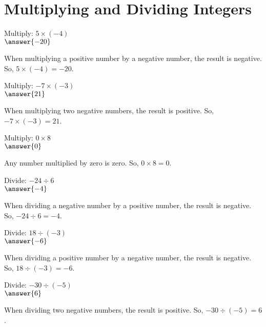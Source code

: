 \documentclass{ximera}
\begin{document}


\section*{Multiplying and Dividing Integers}

\begin{problem}
Multiply: $5 \times (-4)$\\
$\answer{-20}$
\begin{feedback}
When multiplying a positive number by a negative number, the result is negative. So, $5 \times (-4) = -20$.
\end{feedback}
\end{problem}

\begin{problem}
Multiply: $-7 \times (-3)$\\
$\answer{21}$
\begin{feedback}
When multiplying two negative numbers, the result is positive. So, $-7 \times (-3) = 21$.
\end{feedback}
\end{problem}

\begin{problem}
Multiply: $0 \times 8$\\
$\answer{0}$
\begin{feedback}
Any number multiplied by zero is zero. So, $0 \times 8 = 0$.
\end{feedback}
\end{problem}

\begin{problem}
Divide: $-24 \div 6$\\
$\answer{-4}$
\begin{feedback}
When dividing a negative number by a positive number, the result is negative. So, $-24 \div 6 = -4$.
\end{feedback}
\end{problem}

\begin{problem}
Divide: $18 \div (-3)$\\
$\answer{-6}$
\begin{feedback}
When dividing a positive number by a negative number, the result is negative. So, $18 \div (-3) = -6$.
\end{feedback}
\end{problem}

\begin{problem}
Divide: $-30 \div (-5)$\\
$\answer{6}$
\begin{feedback}
When dividing two negative numbers, the result is positive. So, $-30 \div (-5) = 6$.
\end{feedback}
\end{problem}
\end{document}
